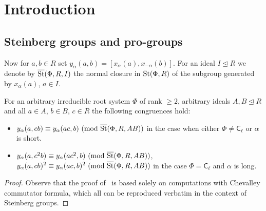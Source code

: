 \documentclass[oneside, 11pt]{amsart} \pdfoutput=1
\begin{document}



\newcommand{\Set}{\mathbf{Set}}
\newcommand{\Group}{\mathbf{Grp}}
\newcommand{\Rng}{\mathbf{Rng}}
\newcommand{\Fun}{\mathbf{Fun}}
\newcommand{\Mod}{\mathbf{Mod}}
\newcommand{\op}{\mathrm{op}}
\newcommand{\ZZ}{\mathbb{Z}}

\newcommand{\otimeshat}{\mathbin{\widehat{\otimes}}}

\newcommand{\up}[2]{{^{#1}\!{#2}}}

\newcommand{\rA}{\mathsf{A}}
\newcommand{\rB}{\mathsf{B}}
\newcommand{\rC}{\mathsf{C}}
\newcommand{\rD}{\mathsf{D}}
\newcommand{\rE}{\mathsf{E}}
\newcommand{\rF}{\mathsf{F}}
\newcommand{\rG}{\mathsf{G}}

\newcommand{\catname}[1]{{\normalfont\textbf{#1}}} %

\section{Introduction}
\subsection{Steinberg groups and pro-groups}

Now for $a, b \in R$ set $y_\alpha(a, b) = [x_\alpha(a), x_{-\alpha}(b)]$.
For an ideal $I \trianglelefteq R$ we denote by $\overline{\mathop{\mathrm{St}}\nolimits}(\Phi, R, I)$ the normal closure in $\mathop{\mathrm{St}}\nolimits(\Phi, R)$ of the subgroup generated by $x_\alpha(a)$, $a\in I$.

\begin{lemma} \label{lem:c-identities} For an arbitrary irreducible root system $\Phi$ of rank $\geq 2$, arbitrary ideals $A, B \trianglelefteq R$ and all $a \in A$, $b \in B$, $c \in R$ the following congruences hold:
\begin{itemize}
 \item $y_\alpha(a, cb) \equiv y_\alpha(ac, b)\ (\mathrm{mod}\ \overline{\mathop{\mathrm{St}}\nolimits}(\Phi, R, AB))$ in the case when either $\Phi \neq \rC_{\ell}$ or $\alpha$ is short.
 \item $y_\alpha(a, c^2b) \equiv y_\alpha(ac^2, b)\ (\mathrm{mod}\ \overline{\mathop{\mathrm{St}}\nolimits}(\Phi, R, AB))$, $y_\alpha(a, cb)^2 \equiv y_\alpha(ac, b)^2\ (\mathrm{mod}\ \overline{\St}(\Phi, R, AB))$ in the case $\Phi = \rC_{\ell}$ and $\alpha$ is long.
\end{itemize} \end{lemma}
\begin{proof}
 Observe that the proof of~\cite[Theorem~5]{VZ20} is based solely on computations with Chevalley commutator formula, which all can be reproduced verbatim in the context of Steinberg groups.
\end{proof}
\end{document}

